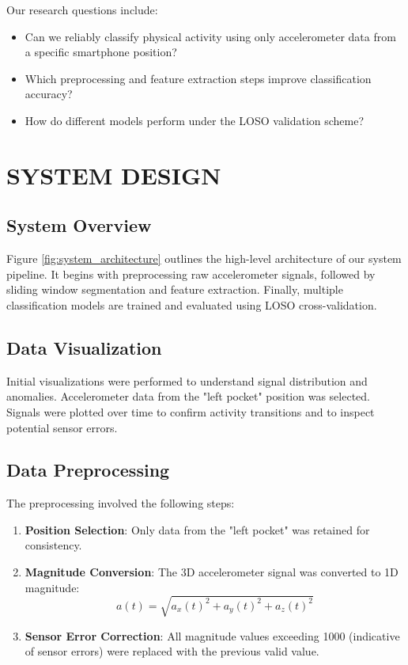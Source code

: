 \documentclass[runningheads]{llncs}
\begin{document}
Our research questions include:
\begin{itemize}
    \item Can we reliably classify physical activity using only accelerometer data from a specific smartphone position?
    \item Which preprocessing and feature extraction steps improve classification accuracy?
    \item How do different models perform under the LOSO validation scheme?
\end{itemize}

\section{SYSTEM DESIGN}

\subsection{System Overview}
Figure \ref{fig:system_architecture} outlines the high-level architecture of our system pipeline. It begins with preprocessing raw accelerometer signals, followed by sliding window segmentation and feature extraction. Finally, multiple classification models are trained and evaluated using LOSO cross-validation.






\subsection{Data Visualization}
Initial visualizations were performed to understand signal distribution and anomalies. Accelerometer data from the "left pocket" position was selected. Signals were plotted over time to confirm activity transitions and to inspect potential sensor errors.

\subsection{Data Preprocessing}
The preprocessing involved the following steps:
\begin{enumerate}
    \item \textbf{Position Selection}: Only data from the "left pocket" was retained for consistency.
    \item \textbf{Magnitude Conversion}: The 3D accelerometer signal was converted to 1D magnitude:
    \[
    a(t) = \sqrt{a_x(t)^2 + a_y(t)^2 + a_z(t)^2}
    \]
    \item \textbf{Sensor Error Correction}: All magnitude values exceeding 1000 (indicative of sensor errors) were replaced with the previous valid value.
\end{enumerate}
\end{document}
